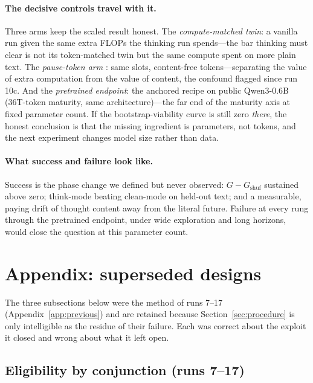 \documentclass{article} %
\newcommand{\gain}{G}
\begin{document}
\paragraph{The decisive controls travel with it.} Three arms keep the scaled result honest. The \emph{compute-matched twin}: a vanilla run given the same extra FLOPs the thinking run spends---the bar thinking must clear is not its token-matched twin but the same compute spent on more plain text. The \emph{pause-token arm} \citep{goyal2024think}: same slots, content-free tokens---separating the value of extra computation from the value of content, the confound flagged since run 10c. And the \emph{pretrained endpoint}: the anchored recipe on public Qwen3-0.6B (36T-token maturity, same architecture)---the far end of the maturity axis at fixed parameter count. If the bootstrap-viability curve is still zero \emph{there}, the honest conclusion is that the missing ingredient is parameters, not tokens, and the next experiment changes model size rather than data.

\paragraph{What success and failure look like.} Success is the phase change we defined but never observed: $\gain - \gain_{\mathrm{shuf}}$ sustained above zero; think-mode beating clean-mode on held-out text; and a measurable, paying drift of thought content away from the literal future. Failure at every rung through the pretrained endpoint, under wide exploration and long horizons, would close the question at this parameter count.

\section{Appendix: superseded designs}
\label{app:superseded}

The three subsections below were the method of runs 7--17 (Appendix~\ref{app:previous}) and are retained because Section~\ref{sec:procedure} is only intelligible as the residue of their failure. Each was correct about the exploit it closed and wrong about what it left open.

\subsection{Eligibility by conjunction (runs 7--17)}
\label{sec:distill-old}
\label{sec:distill}
\end{document}
